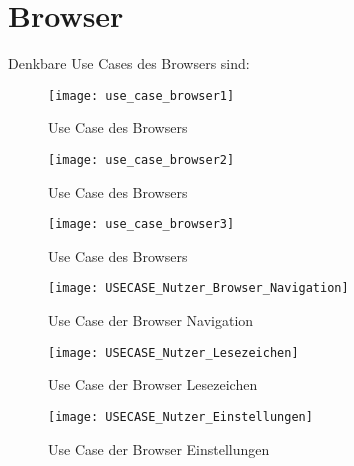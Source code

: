 \author{Gottfried von Recum}

\section{Browser}

Denkbare Use Cases des Browsers sind:
\begin{figure}[h]
	\centering
	\texttt{[image: use\_case\_browser1]}
	\caption{Use Case des Browsers}
	\label{fig:Browser Use-Case}
\end{figure}
\begin{figure}[h]
	\centering
	\texttt{[image: use\_case\_browser2]}
	\caption{Use Case des Browsers}
	\label{fig:Browser Use-Case}
\end{figure}
\begin{figure}[h]
	\centering
	\texttt{[image: use\_case\_browser3]}
	\caption{Use Case des Browsers}
	\label{fig:Browser Use-Case}
\end{figure}
\pagebreak

\begin{figure}[h]
	\centering
	\texttt{[image: USECASE\_Nutzer\_Browser\_Navigation]}
	\caption{Use Case der Browser Navigation}
	\label{fig:Browser Navigation Use-Case}
\end{figure}
\pagebreak

\begin{figure}[h]
	\centering
	\texttt{[image: USECASE\_Nutzer\_Lesezeichen]}
	\caption{Use Case der Browser Lesezeichen}
	\label{fig:Browser Lesezeichen Use-Case}
\end{figure}
\pagebreak

\begin{figure}[h]
	\centering
	\texttt{[image: USECASE\_Nutzer\_Einstellungen]}
	\caption{Use Case der Browser Einstellungen}
	\label{fig:Browser Einstellungen Use-Case}
\end{figure}
\pagebreak